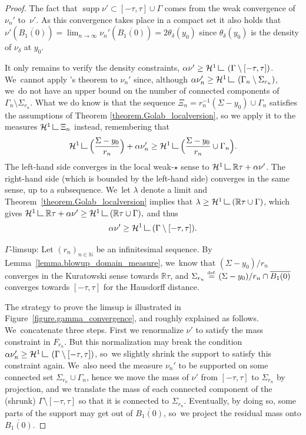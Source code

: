 \documentclass[10pt]{amsart}
\theoremstyle{definition}
\newcommand{\eqdef}{\ensuremath{\stackrel{\mbox{\upshape\tiny def.}}{=}}}
\newcommand\LM[1]{\hbox{\vrule width.5pt \vbox to#1pt{\vfill \hrule width#1pt height.5pt}}}
\newcommand\LL{{\mathchoice {\>\LM7\>}{\>\LM7\>}{\,\LM5\,}{\,\LM{3.35}\,}}}
\newcommand{\mres}{\LL}
\newcommand\cH{\mathcal{H}}
\newcommand{\RR}{\mathbb{R}}
\DeclareMathOperator{\supp}{supp}
\begin{document}
\begin{proof}
The fact that $\supp\nu' \subset [-\tau, \tau]\cup \Gamma$ comes from the weak convergence of~$\nu_{n}'$ to~$\nu'$. As this convergence takes place in a compact set it also holds that $\nu'(\overline{B_1(0)}) = \lim_{n \to \infty} \nu_{n}'(\overline{B_1(0)}) = 2\theta_\delta(y_0)$ since $\theta_\delta(y_0)$ is the density of $\nu_\delta$ at $y_0$.

It only remains to verify the density constraints, $\alpha \nu' \ge \mathcal{H}^1\mres \left(\Gamma\setminus [-\tau,\tau]\right)$. We~cannot apply \Golab's theorem to $\nu_n'$ since, although $\alpha\nu_n' \ge \cH^1\mres \left( \Gamma_n\setminus \Sigma_{r_n}\right)$, we~do not have an upper bound on the number of connected components of $\Gamma_n\setminus \Sigma_{r_n}$. What we do know is that the sequence $\Xi_n = r_n^{-1}(\Sigma - y_0) \cup \Gamma_n$ satisfies the assumptions of Theorem \ref{theorem.Golab_localversion},
so we apply it to the measures $\cH^1\mres\Xi_n$ instead, remembering that
\begin{equation*}
\mathcal{H}^1\mres
\Bigl(
\frac{\Sigma - y_0}{r_n}
\Bigr)
+
\alpha\nu_n'
\ge
\mathcal{H}^1\mres
\Bigl(
\frac{\Sigma - y_0}{r_n}\cup\Gamma_n
\Bigl).
\end{equation*}
The left-hand side converges in the local weak-$\star$ sense to
$\cH^1\mres \RR\tau + \alpha\nu'$. The right-hand side
(which is bounded by the left-hand side)
converges in the same sense, up to a subsequence. We~let
$\lambda$ denote a limit and Theorem~\ref{theorem.Golab_localversion} implies that $\lambda \ge \cH^1\mres (\RR\tau\cup \Gamma)$, which gives
$
\cH^1\mres \RR\tau + \alpha\nu' \ge \cH^1\mres (\RR\tau\cup \Gamma),
$
and thus
\[
\alpha\nu' \ge \cH^1\mres(\Gamma\setminus [-\tau,\tau]).
\]

\par $\Gamma$-limsup: Let $(r_{n})_{n\in\mathbb{N}}$ be an infinitesimal sequence. By Lemma~\ref{lemma.blowup_domain_measure}, we~know that $(\Sigma-y_0)/r_{n}$ converges in the Kuratowski sense towards $\RR\tau$, and $\Sigma_{r_n}\eqdef (\Sigma-\nobreak y_0)/r_{n}\cap\nobreak\overline{B_1(0)}$ converges towards $[-\tau,\tau]$ for the Hausdorff distance.

The strategy to prove the limsup is illustrated in Figure~\ref{figure.gamma_convergence},
and roughly explained as follows. We~concatenate three steps. First we renormalize $\nu'$ to satisfy the mass constraint in $F_{r_{n}}$. But this normalization may break the condition $\alpha \nu_n'\ge \cH^1\mres \left(\Gamma\setminus [-\tau,\tau]\right)$, so~we slightly shrink the support to satisfy this constraint again. We~also need the measure $\nu_{n}'$ to be supported on some connected set $\Sigma_{r_{n}}\cup \Gamma_{n}$, hence we move the mass of $\nu'$ from $[-\tau,\tau]$ to $\Sigma_{r_n}$ by projection, and we translate the mass of each connected component of the (shrunk) $\Gamma\setminus [-\tau,\tau]$ so that it is connected to $\Sigma_{r_n}$. Eventually, by doing so, some parts of the support may get out of $\overline{B_1(0)}$, so~we project the residual mass onto $\overline{B_1(0)}$.


\end{proof}
\end{document}
